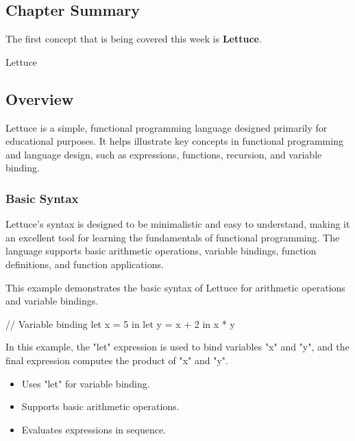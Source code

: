 \subsection{Chapter Summary}

The first concept that is being covered this week is \textbf{Lettuce}.

\begin{notes}{Lettuce}
    \subsection*{Overview}

    Lettuce is a simple, functional programming language designed primarily for educational purposes. It helps illustrate key concepts in functional programming and language design, such as expressions, 
    functions, recursion, and variable binding. 
    
    \subsubsection*{Basic Syntax}
    
    Lettuce's syntax is designed to be minimalistic and easy to understand, making it an excellent tool for learning the fundamentals of functional programming. The language supports basic arithmetic 
    operations, variable bindings, function definitions, and function applications.
    
    \begin{highlight}
    
        This example demonstrates the basic syntax of Lettuce for arithmetic operations and variable bindings.
    
    \begin{code}[Lettuce]
    // Variable binding
    let x = 5 in
    let y = x + 2 in
    x * y
    \end{code}
    
        In this example, the "let" expression is used to bind variables "x" and "y", and the final expression computes the product of "x" and "y".
    
        \begin{itemize}
            \item Uses "let" for variable binding.
            \item Supports basic arithmetic operations.
            \item Evaluates expressions in sequence.
        \end{itemize}
    

\end{highlight}
\end{notes}
